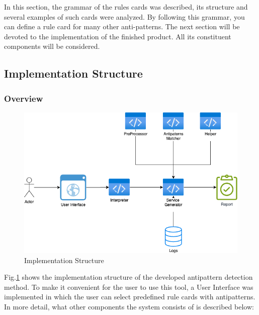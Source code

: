 \documentclass[12pt, times]{article}
\begin{document}
	\hspace*{5mm} In this section, the grammar of the rules cards was described, its structure and several examples of such cards were analyzed. By following this grammar, you can define a rule card for many other anti-patterns. The next section will be devoted to the implementation of the finished product. All its constituent components will be considered.
	
	\subsection{Implementation Structure}
	
	 \subsubsection{Overview}
	
	 \begin{figure}[h]
		\centering
		\includegraphics[scale=0.6]{scheme2}
		\caption{Implementation Structure}
		\label{fig:scheme2}
	\end{figure}
	
	 \hspace*{5mm} Fig.\ref{fig:scheme2} shows the implementation structure of the developed antipattern detection method. To make it convenient for the user to use this tool, a User Interface was implemented in which the user can select predefined rule cards with antipatterns. In more detail, what other components the system consists of is described below:
	 
\end{document}
